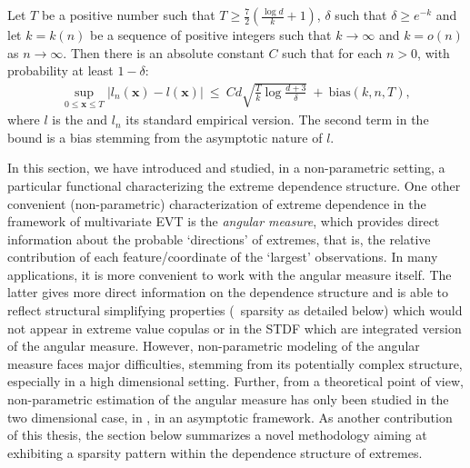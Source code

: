 \begin{theorem}
\label{resume_fr:thm:l}
Let $T$ be a positive number such that $T \ge \frac{7}{2}(\frac{\log d}{k} + 1)$, $\delta$ such that $\delta \ge e^{-k}$ and let $k=k(n)$ be a sequence of positive integers such that $k \to \infty$ and $k=o(n)$ as $n \to \infty$. Then there is an absolute constant $C$ such that for each $n >0$, with probability at least $1-\delta$:
\begin{align*}
\sup_{0 \le \mathbf{x} \le T} \left| l_n(\mathbf{x}) - l(\mathbf{x}) \right| ~\le~ Cd\sqrt{\frac{T}{k}\log\frac{d+3}{\delta}} ~+~
\text{bias}(k, n, T),
\end{align*}
where $l$ is the \stdf and $l_n$ its standard empirical version. The second term in the bound is a bias stemming from the asymptotic nature of $l$.
\end{theorem}


In this section, we have introduced and studied, in a non-parametric setting, a particular functional characterizing the extreme dependence structure.
%
One other convenient (non-parametric) characterization of  extreme dependence in the framework of multivariate EVT is the \textit{angular measure}, which provides direct information about the probable `directions' of extremes, that is, the relative contribution of each feature/coordinate of the `largest' observations.
%
In many applications, it is more convenient to work with the angular measure itself. The latter gives more direct information on the dependence structure and is able to reflect structural simplifying properties (\eg~sparsity as detailed below) which would not appear in extreme value copulas or in the STDF which are integrated version of the angular measure.
However, non-parametric modeling of the angular measure faces major difficulties, stemming from its potentially complex structure, especially in a high dimensional setting.
Further, from a theoretical point of view, non-parametric estimation of the angular measure has only been studied in the two dimensional case, in \cite{Einmahl2001, Einmahl2009}, in an asymptotic framework. As another contribution of this thesis, the section below summarizes a novel methodology %
aiming at exhibiting a sparsity pattern within the dependence structure of extremes.



